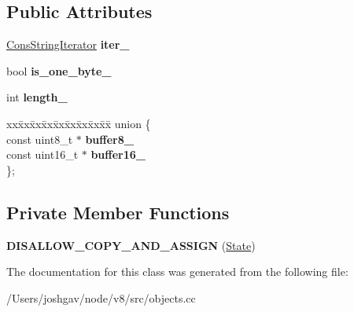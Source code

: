 \subsection*{Public Attributes}
\begin{DoxyCompactItemize}
\item 
\hyperlink{classv8_1_1internal_1_1_cons_string_iterator}{Cons\+String\+Iterator} {\bfseries iter\+\_\+}\hypertarget{classv8_1_1internal_1_1_string_comparator_1_1_state_a35f04c2dabfad6fc2ad5642ff750b6fe}{}\label{classv8_1_1internal_1_1_string_comparator_1_1_state_a35f04c2dabfad6fc2ad5642ff750b6fe}

\item 
bool {\bfseries is\+\_\+one\+\_\+byte\+\_\+}\hypertarget{classv8_1_1internal_1_1_string_comparator_1_1_state_a3ebc45d94abd2047971e6baa84f7d54e}{}\label{classv8_1_1internal_1_1_string_comparator_1_1_state_a3ebc45d94abd2047971e6baa84f7d54e}

\item 
int {\bfseries length\+\_\+}\hypertarget{classv8_1_1internal_1_1_string_comparator_1_1_state_a123ebc5f513ca8e7ffb7052a323fb1d6}{}\label{classv8_1_1internal_1_1_string_comparator_1_1_state_a123ebc5f513ca8e7ffb7052a323fb1d6}

\item 
\begin{tabbing}
xx\=xx\=xx\=xx\=xx\=xx\=xx\=xx\=xx\=\kill
union \{\\
\>const uint8\_t $\ast$ {\bfseries buffer8\_}\\
\>const uint16\_t $\ast$ {\bfseries buffer16\_}\\
\}; \hypertarget{classv8_1_1internal_1_1_string_comparator_1_1_state_ac8bdd4dfd9ec48f41d95fa33481faac5}{}\label{classv8_1_1internal_1_1_string_comparator_1_1_state_ac8bdd4dfd9ec48f41d95fa33481faac5}
\\

\end{tabbing}\end{DoxyCompactItemize}
\subsection*{Private Member Functions}
\begin{DoxyCompactItemize}
\item 
{\bfseries D\+I\+S\+A\+L\+L\+O\+W\+\_\+\+C\+O\+P\+Y\+\_\+\+A\+N\+D\+\_\+\+A\+S\+S\+I\+GN} (\hyperlink{classv8_1_1internal_1_1_string_comparator_1_1_state}{State})\hypertarget{classv8_1_1internal_1_1_string_comparator_1_1_state_a1a2413084d20f729e3fbde3616e4a2d6}{}\label{classv8_1_1internal_1_1_string_comparator_1_1_state_a1a2413084d20f729e3fbde3616e4a2d6}

\end{DoxyCompactItemize}


The documentation for this class was generated from the following file\+:\begin{DoxyCompactItemize}
\item 
/\+Users/joshgav/node/v8/src/objects.\+cc\end{DoxyCompactItemize}
